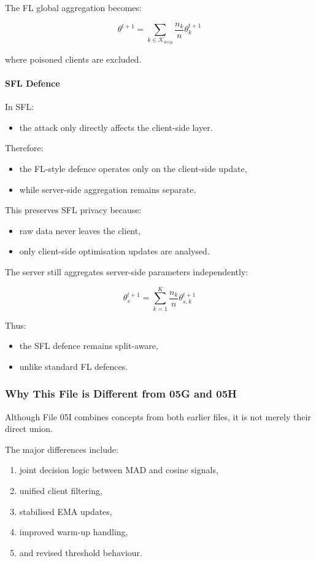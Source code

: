 The FL global aggregation becomes:

\[
\theta^{t+1}
=
\sum_{k \in \mathcal{K}_{keep}}
\frac{n_k}{n}
\theta_k^{t+1}
\]

where poisoned clients are excluded.

\paragraph{SFL Defence}

In SFL:
\begin{itemize}
    \item the attack only directly affects the client-side layer.
\end{itemize}

Therefore:
\begin{itemize}
    \item the FL-style defence operates only on the client-side update,
    \item while server-side aggregation remains separate.
\end{itemize}

This preserves SFL privacy because:
\begin{itemize}
    \item raw data never leaves the client,
    \item only client-side optimisation updates are analysed.
\end{itemize}

The server still aggregates server-side parameters independently:

\[
\theta_s^{t+1}
=
\sum_{k=1}^{K}
\frac{n_k}{n}
\theta_{s,k}^{t+1}
\]

Thus:
\begin{itemize}
    \item the SFL defence remains split-aware,
    \item unlike standard FL defences.
\end{itemize}

\subsubsection*{Why This File is Different from 05G and 05H}

Although File 05I combines concepts from both earlier files, it is not merely their direct union.

The major differences include:

\begin{enumerate}
    \item joint decision logic between MAD and cosine signals,
    \item unified client filtering,
    \item stabilised EMA updates,
    \item improved warm-up handling,
    \item and revised threshold behaviour.
\end{enumerate}

